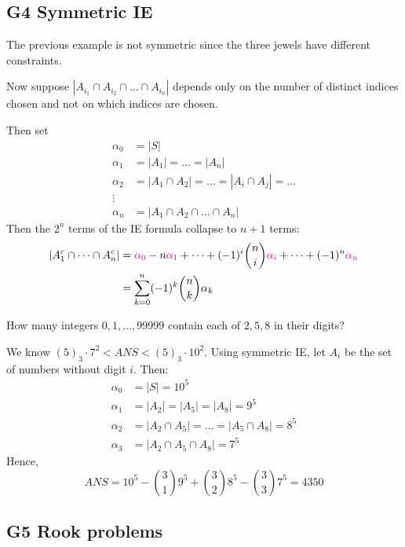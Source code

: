 \documentclass[12pt]{article}
\begin{document}
\subsection{G4 Symmetric IE}
\rmk The previous example is not symmetric since the three jewels have different constraints.

Now suppose $|A_{i_1}\cap A_{i_2}\cap\dots\cap A_{i_h}| $ depends only on the number of distinct indices chosen and not on which indices are chosen. 

Then set \begin{align*}
    \alpha_0&=|S|\\
    \alpha_1&=|A_1|=\dots =|A_n|\\
    \alpha_2 &= |A_1\cap A_2|=\dots = |A_i\cap A_j|=\dots\\
    \vdots\\
    \alpha_n &= |A_1\cap A_2\cap \dots \cap A_n|
\end{align*}
Then the $2^n$ terms of the IE formula collapse to $n+1$ terms:\begin{align*}
    |A_1^c\cap \dots\cap A_n^c| &= \textcolor{magenta}{\alpha_0}-n\textcolor{magenta}{\alpha_1}+\dots+(-1)^i {n\choose i}\textcolor{magenta}{\alpha_i}+\dots +(-1)^n\textcolor{magenta}{\alpha_n}\\
    &=\sum_{k=0}^{n}(-1)^k{n\choose k}\alpha_k
\end{align*}

\eg How many integers $0,1,\dots, 99999$ contain each of $2,5,8$ in their digits?

We know $(5)_3\cdot 7^2<ANS<(5)_3\cdot 10^2$. Using symmetric IE, let $A_i$ be the set of numbers without digit $i$. Then: \begin{align*}
    \alpha_0&=|S| = 10^5\\
    \alpha_1&=|A_2|=|A_5|=|A_8| = 9^5\\
    \alpha_2 &= |A_2\cap A_5|=\dots = |A_5\cap A_8|= 8^5\\
    \alpha_3 &= |A_2\cap A_5\cap A_8| = 7^5
\end{align*}
Hence, \[ANS = 10^5-{3\choose 1}9^5+{3\choose 2}8^5-{3\choose 3}7^5=4350\]

\subsection{G5 Rook problems}
\end{document}
